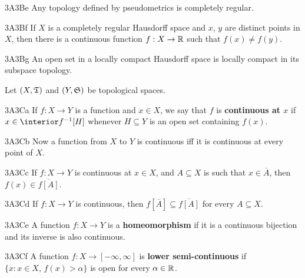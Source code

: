\spheader 3A3Be
Any topology defined by pseudometrics is completely
regular.  

\spheader 3A3Bf If $X$ is a completely regular Hausdorff
space and $x$, $y$ are distinct points in $X$, then there is a
continuous function $f:X\to\Bbb R$ such that $f(x)\ne f(y)$.

\spheader 3A3Bg An open set in a locally compact Hausdorff space is
locally compact in its subspace topology.

 Let $(X,\frak T)$ and $(Y,\frak S)$
be topological spaces.

\spheader 3A3Ca If $f:X\to Y$ is a function and $x\in X$, we say that
$f$ is {\bf continuous at $x$} if $x\in\interior f^{-1}[H]$ whenever
$H\subseteq Y$ is an open set containing $f(x)$.

\spheader 3A3Cb Now a function from $X$ to $Y$ is continuous iff it is
continuous at every point of $X$.  

\spheader 3A3Cc If $f:X\to Y$ is continuous at $x\in X$, and
$A\subseteq X$ is such that $x\in\overline{A}$, then
$f(x)\in\overline{f[A]}$.

\spheader 3A3Cd If $f:X\to Y$ is continuous, then
$f[\overline{A}]\subseteq\overline{f[A]}$ for every $A\subseteq X$.

\spheader 3A3Ce A function $f:X\to Y$ is a {\bf homeomorphism} if it is
a continuous bijection and its inverse is also
continuous.

\spheader 3A3Cf A function $f:X\to[-\infty,\infty]$ is
{\bf lower semi-continuous} if $\{x:x\in X,\,f(x)>\alpha\}$ is open for
every $\alpha\in\Bbb R$.  

